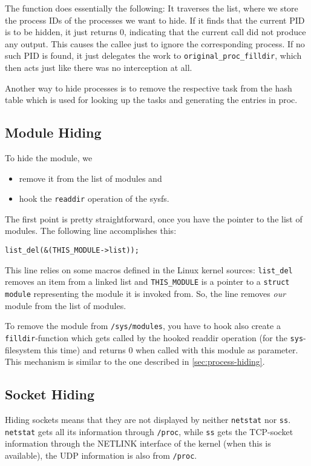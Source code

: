 \documentclass[10pt, letterpaper]{article}
\begin{document}
The function does essentially the following: It traverses the list, where we store the process IDs of the processes we want to hide. If it finds that the current PID is to be hidden, it just returns 0, indicating that the current call did not produce any output. This causes the callee just to ignore the corresponding process. If no such PID is found, it just delegates the work to \texttt{original\_proc\_filldir}, which then acts just like there was no interception at all.

Another way to hide processes is to remove the respective task from the hash table which is used for looking up the tasks and generating the entries in proc.

\subsection{Module Hiding}
To hide the module, we 
\begin{itemize}
 \item remove it from the list of modules and
 \item hook the \texttt{readdir} operation of the sysfs.
\end{itemize}

The first point is pretty straightforward, once you have the pointer to the list of modules. The following line accomplishes this:

\begin{verbatim}
list_del(&(THIS_MODULE->list));
\end{verbatim}

This line relies on some macros defined in the Linux kernel sources: \texttt{list\_del} removes an item from a linked list and \texttt{THIS\_MODULE} is a pointer to a \texttt{struct module} representing the module it is invoked from. So, the line removes \emph{our} module from the list of modules.

To remove the module from \texttt{/sys/modules}, you have to hook also create a \texttt{filldir}-function which gets called by the hooked readdir operation (for the \texttt{sys}-filesystem this time) and returns 0 when called with this module as parameter. This mechanism is similar to the one described in \autoref{sec:process-hiding}.

\subsection{Socket Hiding}

Hiding sockets means that they are not displayed by neither \texttt{netstat} nor \texttt{ss}. \texttt{netstat} gets all its information through \texttt{/proc}, while \texttt{ss} gets the TCP-socket information through the NETLINK interface of the kernel (when this is available), the UDP information is also from \texttt{/proc}.
\end{document}
